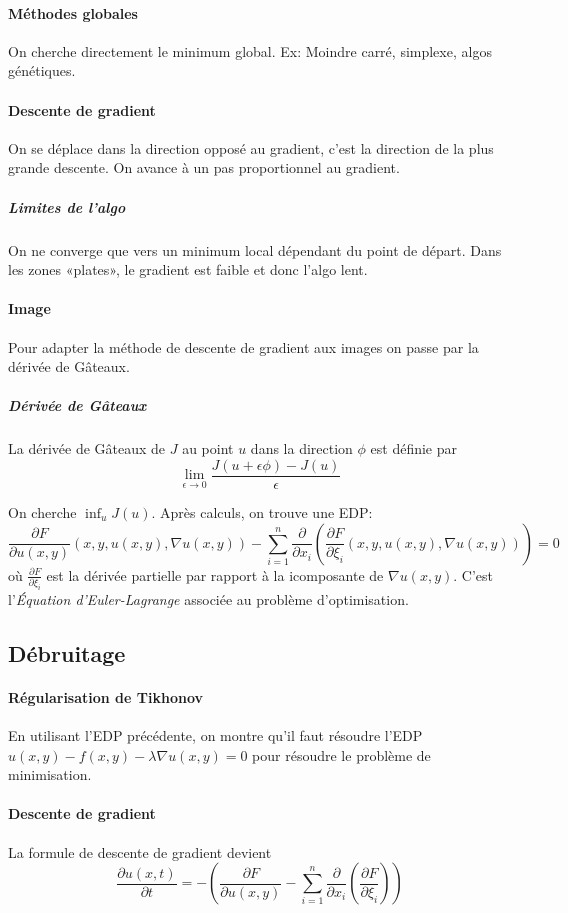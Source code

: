 \documentclass[french]{article}
\begin{document}
\paragraph{Méthodes globales} On cherche directement le minimum global.
Ex: Moindre carré, simplexe, algos génétiques.

\paragraph{Descente de gradient} On se déplace dans la direction opposé au
gradient, c'est la direction de la plus grande descente. On avance à un
pas proportionnel au gradient.

\subparagraph{Limites de l'algo} On ne converge que vers un minimum local
dépendant du point de départ. Dans les zones «plates», le gradient est
faible et donc l'algo lent.

\paragraph{Image} Pour adapter la méthode de descente de gradient aux
images on passe par la dérivée de Gâteaux.

\subparagraph{Dérivée de Gâteaux} La dérivée de Gâteaux de $J$ au point
$u$ dans la direction $\phi$ est définie par
$$\lim_{\epsilon \to 0} \frac{J(u + \epsilon \phi) - J(u)}{\epsilon}$$

On cherche $\inf_u J(u)$. Après calculs, on trouve une EDP:
$$\frac{\partial F}{\partial u(x,y)}(x, y, u(x,y),\nabla u(x,y))
- \sum_{i=1}^n \frac{\partial}{\partial x_i}
(\frac{\partial F}{\partial \xi_i}(x, y, u(x,y),\nabla u(x,y))) = 0$$
où $\frac{\partial F}{\partial \xi_i}$ est la dérivée partielle par
rapport à la i\ieme composante de $\nabla u (x,y)$.
C'est l'\emph{Équation d'Euler-Lagrange} associée au problème d'optimisation.

\subsection{Débruitage}
\paragraph{Régularisation de Tikhonov} En utilisant l'EDP précédente,
on montre qu'il faut résoudre l'EDP $u(x,y) -f(x,y) -\lambda \nabla u(x,y) = 0$
pour résoudre le problème de minimisation.

\paragraph{Descente de gradient} La formule de descente de gradient devient
$$\frac{\partial u(x,t)}{\partial t} = -\left(\frac{\partial F}{\partial u(x,y)}
- \sum_{i=1}^n \frac{\partial}{\partial x_i} (\frac{\partial F}{\partial \xi_i})\right)$$
\end{document}
